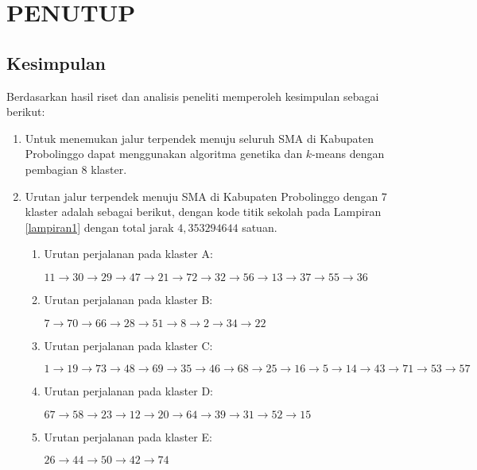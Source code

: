 \chapter{PENUTUP}

\section{Kesimpulan}

Berdasarkan hasil riset dan analisis peneliti memperoleh kesimpulan sebagai berikut:

\begin{enumerate}
\item Untuk menemukan jalur terpendek menuju seluruh SMA di Kabupaten Probolinggo dapat menggunakan algoritma genetika dan $k$-means dengan pembagian 8 klaster.
\item Urutan jalur terpendek menuju SMA di Kabupaten Probolinggo dengan 7 klaster adalah sebagai berikut, dengan kode titik sekolah pada Lampiran \ref{lampiran1} dengan total jarak $4,353294644$ satuan.

\begin{enumerate}

\item Urutan perjalanan pada klaster A:

$11\rightarrow30\rightarrow29\rightarrow47\rightarrow21\rightarrow72\rightarrow32\rightarrow56\rightarrow13\rightarrow37\rightarrow55\rightarrow36$

\item Urutan perjalanan pada klaster B:

$7\rightarrow70\rightarrow66\rightarrow28\rightarrow51\rightarrow8\rightarrow2\rightarrow34\rightarrow22$

\item Urutan perjalanan pada klaster C:

$1\rightarrow19\rightarrow73\rightarrow48\rightarrow69\rightarrow35\rightarrow46\rightarrow68\rightarrow25\rightarrow16\rightarrow5\rightarrow14\rightarrow43\rightarrow71\rightarrow53\rightarrow57$

\item Urutan perjalanan pada klaster D:

$67\rightarrow58\rightarrow23\rightarrow12\rightarrow20\rightarrow64\rightarrow39\rightarrow31\rightarrow52\rightarrow15$

\item Urutan perjalanan pada klaster E:

$26\rightarrow44\rightarrow50\rightarrow42\rightarrow74$


\end{enumerate}
\end{enumerate}
